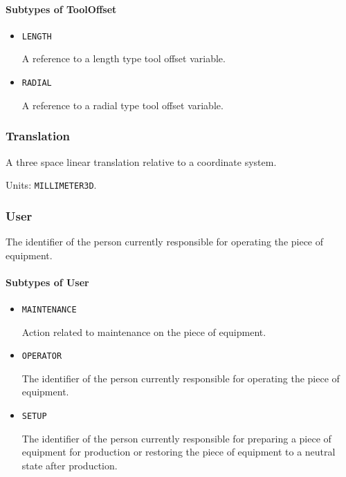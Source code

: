 \paragraph{Subtypes of ToolOffset}\mbox{}
\label{sec:Subtypes of ToolOffset}

\begin{itemize}

\item \texttt{LENGTH}


A reference to a length type tool offset variable.

\item \texttt{RADIAL}


A reference to a radial type tool offset variable.


\end{itemize}

\subsubsection{Translation}




A three space linear translation relative to a coordinate system.



Units: \texttt{MILLIMETER\textunderscore 3D}.

\subsubsection{User}
\label{sec:User}



The identifier of the person currently responsible for operating the piece of equipment.


\paragraph{Subtypes of User}\mbox{}
\label{sec:Subtypes of User}

\begin{itemize}

\item \texttt{MAINTENANCE}


Action related to maintenance on the piece of equipment.

\item \texttt{OPERATOR}


The identifier of the person currently responsible for operating the piece of equipment.

\item \texttt{SET\textunderscore UP}


The identifier of the person currently responsible for preparing a piece of equipment for production or restoring the piece of equipment to a neutral state after production.


\end{itemize}

